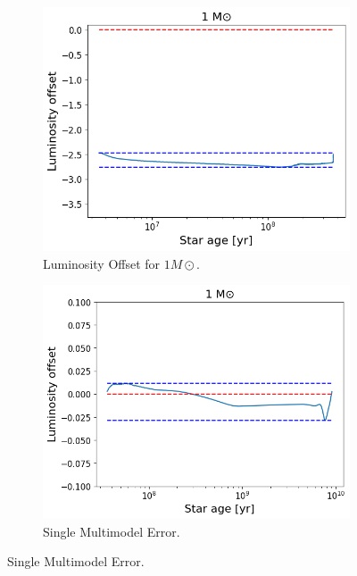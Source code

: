 \begin{figure}[H]
	\centering
	\begin{subfigure}{\textwidth}
		\includegraphics[width=\textwidth,height=0.5\textheight]{assets/error1modelsingle.png}
		\caption{Luminosity Offset for $1M\odot$.}
	\end{subfigure}
	\begin{subfigure}{\textwidth}
		\includegraphics[width=\textwidth,height=0.5\textheight]{assets/error 1.png}
		\caption{Single Multimodel Error.}	
\end{subfigure}
	\label{fig:lumoff}
\end{figure}

